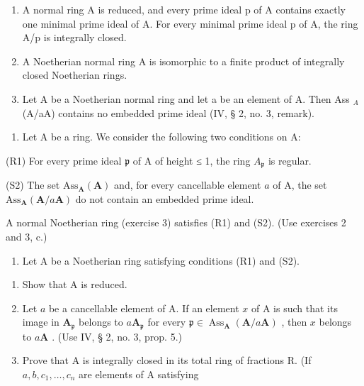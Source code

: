 \begin{enumerate}
\def\labelenumi{\alph{enumi})}
\item
  A normal ring A is reduced, and every prime ideal p of A contains exactly one minimal prime ideal of A. For every minimal prime ideal p of A, the ring A/p is integrally closed.
\item
  A Noetherian normal ring A is isomorphic to a finite product of integrally closed Noetherian rings.
\item
  Let A be a Noetherian normal ring and let a be an element of A. Then Ass \(_{A}\) (A/aA) contains no embedded prime ideal (IV, § 2, no. 3, remark).
\end{enumerate}

\begin{enumerate}
\def\labelenumi{\arabic{enumi})}
\setcounter{enumi}{3}
\tightlist
\item
  Let A be a ring. We consider the following two conditions on A:
\end{enumerate}

(R1) For every prime ideal \(\mathfrak{p}\) of A of height ≤ 1, the ring \(A_{\mathfrak{p}}\) is regular.

(S2) The set \(\mathrm{Ass}_{\mathbf{A}}(\mathbf{A})\) and, for every cancellable element \(a\) of A, the set \(\mathrm{Ass}_{\mathbf{A}}(\mathbf{A}/a\mathbf{A})\) do not contain an embedded prime ideal.

A normal Noetherian ring (exercise 3) satisfies (R1) and (S2). (Use exercises 2 and 3, c.)

\begin{enumerate}
\def\labelenumi{\arabic{enumi})}
\setcounter{enumi}{4}
\tightlist
\item
  Let A be a Noetherian ring satisfying conditions (R1) and (S2).
\end{enumerate}

\begin{enumerate}
\def\labelenumi{\alph{enumi})}
\item
  Show that A is reduced.
\item
  Let \(a\) be a cancellable element of A. If an element \(x\) of A is such that its image in \(\mathbf{A}_{\mathfrak{p}}\) belongs to \(a\mathbf{A}_{\mathfrak{p}}\) for every \(\mathfrak{p} \in \operatorname{Ass}_{\mathbf{A}}(\mathbf{A}/a\mathbf{A})\) , then \(x\) belongs to \(a\mathbf{A}\) . (Use IV, § 2, no. 3, prop. 5.)
\item
  Prove that A is integrally closed in its total ring of fractions R. (If \(a, b, c_{1}, \ldots, c_{n}\) are elements of A satisfying
\end{enumerate}

